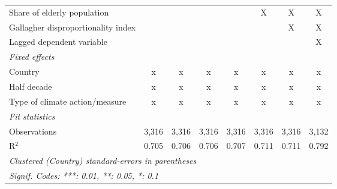 \begin{tabular}{lccccccc}
   Share of elderly population                                             &                &                &                &                & X             & X             & X\\  
   Gallagher disproportionality index                                      &                &                &                &                &               & X             & X\\  
   Lagged dependent variable                                               &                &                &                &                &               &               & X\\  
   \emph{Fixed effects}\\
   Country                                                                 & x              & x              & x              & x              & x             & x             & x\\  
   Half decade                                                             & x              & x              & x              & x              & x             & x             & x\\  
   Type of climate action/measure                                          & x              & x              & x              & x              & x             & x             & x\\  
   \midrule \emph{Fit statistics}\\
   Observations                                                            & 3,316          & 3,316          & 3,316          & 3,316          & 3,316         & 3,316         & 3,132\\  
   R$^2$                                                                   & 0.705          & 0.706          & 0.706          & 0.707          & 0.711         & 0.711         & 0.792\\  
   \midrule
   \multicolumn{8}{l}{\emph{Clustered (Country) standard-errors in parentheses}}\\
   \multicolumn{8}{l}{\emph{Signif. Codes: ***: 0.01, **: 0.05, *: 0.1}}\\
\end{tabular}
\par\endgroup


